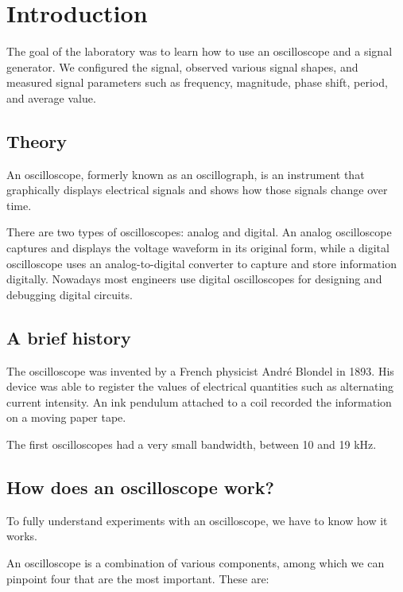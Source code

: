 \section{Introduction}

The goal of the laboratory was to learn how to use an oscilloscope and a signal generator. We configured the signal, observed various signal shapes, and measured signal parameters such as frequency, magnitude, phase shift, period, and average value.

\subsection*{Theory}

An oscilloscope, formerly known as an oscillograph, is an instrument that graphically displays electrical signals and shows how those signals change over time.

There are two types of oscilloscopes: analog and digital. An analog oscilloscope captures and displays the voltage waveform in its original form, while a digital oscilloscope uses an analog-to-digital converter to capture and store information digitally. Nowadays most engineers use digital oscilloscopes for designing and debugging digital circuits.

\subsection*{A brief history}

The oscilloscope was invented by a French physicist André Blondel in 1893. His device was able to register the values of electrical quantities such as alternating current intensity. An ink pendulum attached to a coil recorded the information on a moving paper tape. 

The first oscilloscopes had a very small bandwidth, between 10 and 19 kHz.

\subsection*{How does an oscilloscope work?}

To fully understand experiments with an oscilloscope, we have to know how it works.

An oscilloscope is a combination of various components, among which we can pinpoint four that are the most important. These are:

